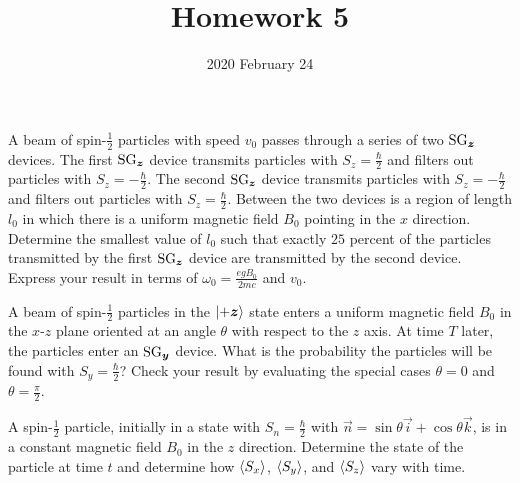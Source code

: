 \documentclass{../phys116}
\title{Homework 5}
\author{}
\date{2020 February 24}
\begin{document}
\begin{exercise}
  A beam of spin-\(\frac 1 2\) particles with speed \(v_0\) passes
  through a series of two \(\SG_{\vec z}\) devices.  The first
  \(\SG_{\vec z}\) device transmits particles with
  \(S_z = \frac \hbar 2\) and filters out particles with
  \(S_z = -\frac \hbar 2\).  The second \(\SG_{\vec z}\) device
  transmits particles with \(S_z = -\frac \hbar 2\) and filters out
  particles with \(S_z = \frac \hbar 2\).  Between the two devices is
  a region of length \(l_0\) in which there is a uniform magnetic
  field \(B_0\) pointing in the \(x\) direction.  Determine the
  smallest value of \(l_0\) such that exactly \(25\) percent of the
  particles transmitted by the first \(\SG_{\vec z}\) device are
  transmitted by the second device.  Express your result in terms of
  \(\omega_0 = \frac{egB_0}{2mc}\) and \(v_0\).
\end{exercise}

\begin{solution}

\end{solution}

\begin{exercise}
  A beam of spin-\(\frac 1 2\) particles in the \(\ket{+\vec z}\)
  state enters a uniform magnetic field \(B_0\) in the \(x\)-\(z\)
  plane oriented at an angle \(\theta\) with respect to the \(z\)
  axis.  At time \(T\) later, the particles enter an \(\SG_{\vec y}\)
  device.  What is the probability the particles will be found with
  \(S_y = \frac \hbar 2\)?  Check your result by evaluating the
  special cases \(\theta = 0\) and \(\theta = \frac \pi 2\).
\end{exercise}

\begin{solution}

\end{solution}

\begin{exercise}
  A spin-\(\frac 1 2\) particle, initially in a state with
  \(S_n = \frac \hbar 2\) with
  \(\vec n = \sin \theta \vec i + \cos \theta \vec k\), is in a
  constant magnetic field \(B_0\) in the \(z\) direction.  Determine
  the state of the particle at time \(t\) and determine how
  \(\langle S_x\rangle\), \(\langle S_y\rangle\), and \(\langle S_z\rangle\) vary with time.
\end{exercise}

\begin{solution}

\end{solution}
\end{document}
